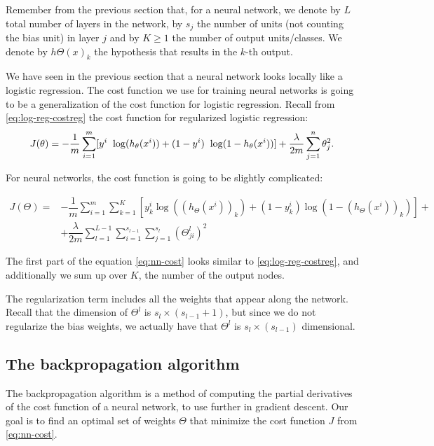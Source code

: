 \documentclass[a4paper,11pt]{report}
\begin{document}
Remember from the previous section that, for a neural network, we denote by $L$ total number of layers in the network, by $s_j$ the number of units (not counting the bias unit) in layer $j$ and by $K \geq 1$ the number of output units/classes. We denote by $h\Theta(x)_k$ the hypothesis that results in the $k$-th output.

We have seen in the previous section that a neural network looks locally like a logistic regression. The cost function we use for training neural networks is going to be a generalization of the cost function for logistic regression. Recall from \eqref{eq:log-reg-costreg} the cost function for regularized logistic regression:
$$ J(\theta) = - \dfrac{1}{m} \sum_{i=1}^m \large[ y^{i}\ \log (h_\theta (x^{i})) + (1 - y^{i})\ \log (1 - h_\theta(x^{i}))\large] + \frac{\lambda}{2m}\sum_{j=1}^n \theta_j^2.$$

For neural networks, the cost function is going to be slightly complicated:

\begin{equation}\label{eq:nn-cost}
\begin{split}
J(\Theta) = & - \dfrac{1}{m} \sum_{i=1}^m \sum_{k=1}^K \left[y^{i}_k \log ((h_\Theta (x^{i}))_k) + (1 - y^{i}_k)\log (1 - (h_\Theta(x^{i}))_k)\right] + \\
            & + \dfrac{\lambda}{2m}\sum_{l=1}^{L-1} \sum_{i=1}^{s_{l-1}} \sum_{j=1}^{s_{l}} \left( \Theta_{ji}^{l}\right)^2
\end{split}
\end{equation}

The first part of the equation \eqref{eq:nn-cost} looks similar to \eqref{eq:log-reg-costreg}, and additionally  we sum up over $K$, the number of the output nodes.

The regularization term includes all the weights that appear along the network. Recall that the dimension of $\Theta^l$ is $s_l \times (s_{l-1}+1)$, but since we do not regularize the bias weights, we actually have that $\Theta^l$ is $s_l \times (s_{l-1})$ dimensional.


\subsection*{The backpropagation algorithm}

The backpropagation algorithm is a method of computing the partial derivatives of the cost function of a neural network, to use further in gradient descent. Our goal is to find an optimal set of weights $\Theta$ that minimize the cost function $J$ from \eqref{eq:nn-cost}.
\end{document}
